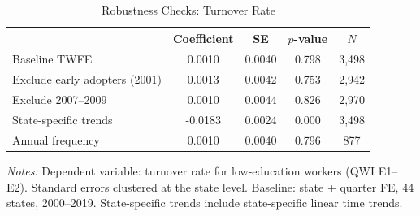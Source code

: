 \begin{table}[htbp]
\centering
\caption{Robustness Checks: Turnover Rate}
\label{tab:robustness}
\begin{tabular}{lcccc}
\toprule
 & Coefficient & SE & $p$-value & $N$ \\
\midrule
Baseline TWFE & 0.0010 & 0.0040 & 0.798 & 3,498 \\
Exclude early adopters (2001) & 0.0013 & 0.0042 & 0.753 & 2,942 \\
Exclude 2007--2009 & 0.0010 & 0.0044 & 0.826 & 2,970 \\
State-specific trends & -0.0183 & 0.0024 & 0.000 & 3,498 \\
Annual frequency & 0.0010 & 0.0040 & 0.796 & 877 \\
\bottomrule
\end{tabular}
\begin{tablenotes}[flushleft]
\small
\item \textit{Notes:} Dependent variable: turnover rate for low-education workers (QWI E1--E2). Standard errors clustered at the state level. Baseline: state + quarter FE, 44 states, 2000--2019. State-specific trends include state-specific linear time trends.
\end{tablenotes}
\end{table}
